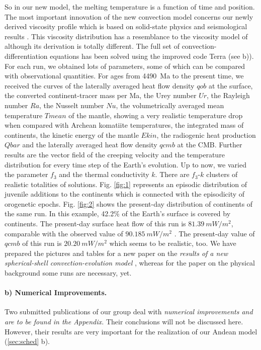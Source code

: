 \documentclass[twoside,10pt]{article}
\begin{document}
So in our new model, the melting temperature is a function of time and position. 
The most important innovation of the new convection model concerns our newly derived viscosity profile which is based on solid-state physics and seismological results \cite{Walzer2012,Walzer2012b}.
This viscosity distribution has a resemblance to the viscosity model of \cite{Mitrovica2004} although its derivation is totally different.
The full set of convection-differentiation equations has been solved using the improved code Terra (see b)).
For each run, we obtained lots of parameters, some of which can be compared with observational quantities. 
For ages from 4490~Ma to the present time, we received the curves of the laterally averaged heat flow density $qob$ at the surface, the converted continent-tracer mass per Ma, the Urey number $Ur$, the Rayleigh number $Ra$, the Nusselt number $Nu$, the volumetrically averaged mean temperature $Tmean$ of the mantle, showing a very realistic temperature drop when compared with Archean komatiite temperatures, the integrated mass of continents, the kinetic energy of the mantle $Ekin$, the radiogenic heat production $Qbar$ and the laterally averaged heat flow density $qcmb$ at the CMB.
Further results are the vector field of the creeping velocity and the temperature distribution for every time step of the Earth's evolution.
Up to now, we varied the parameter $f_3$ and the thermal conductivity $k$.
There are $f_3$-$k$ clusters of realistic totalities of solutions. 
Fig. \ref{fig:1} represents an episodic distribution of juvenile additions to the continents which is connected with the episodicity of orogenetic epochs.
Fig. \ref{fig:2} shows the present-day distribution of continents of the same run.
In this example, 42.2\% of the Earth's surface is covered by continents. 
The present-day surface heat flow of this run is $81.39~mW/m^2$, comparable with the observed value of $90.185~mW/m^2$ \cite{Davies2010}.
The present-day value of $qcmb$ of this run is $20.20~mW/m^2$ which seems to be realistic, too.
We have prepared the pictures and tables for a new paper on the \emph{results of a new spherical-shell convection-evolution model} \cite{Walzer2012b}, whereas for the paper on the physical background \cite{Walzer2012} some runs are necessary, yet.

\paragraph{b) Numerical Improvements.}
Two submitted publications of our group \cite{Koestler2012,Mueller2012} deal with \emph{numerical improvements and are to be found in the Appendix.}
Their conclusions will not be discussed here.
However, their results are very important for the realization of our Andean model (\ref{sec:sched} b).
\end{document}
